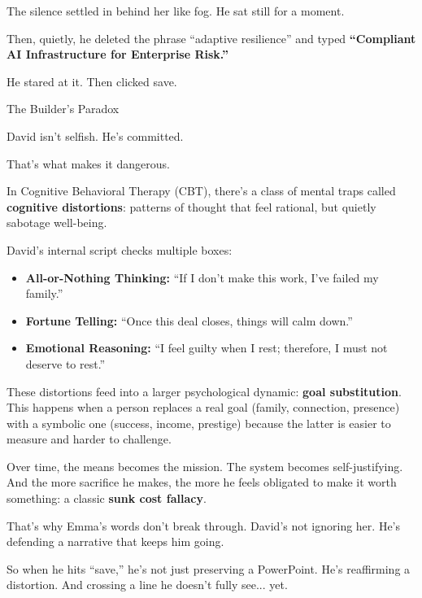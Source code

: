 The silence settled in behind her like fog. He sat still for a moment.

Then, quietly, he deleted the phrase ``adaptive resilience'' and typed \textbf{``Compliant AI Infrastructure 
for Enterprise Risk.''}

He stared at it. Then clicked save.

\medskip

\begin{PsychologicalSidebar}{The Builder’s Paradox}

  David isn’t selfish. He’s committed.

  \medskip
  
  That’s what makes it dangerous.
  
  \medskip
  
  In Cognitive Behavioral Therapy (CBT), there’s a class of mental traps called \textbf{cognitive distortions}: 
  patterns of thought that feel rational, but quietly sabotage well-being.

  \medskip
  
  David’s internal script checks multiple boxes:

  \medskip
  
  \begin{itemize}
    \item \textbf{All-or-Nothing Thinking:} “If I don’t make this work, I’ve failed my family.”
    \item \textbf{Fortune Telling:} “Once this deal closes, things will calm down.”
    \item \textbf{Emotional Reasoning:} “I feel guilty when I rest; therefore, I must not deserve to rest.”
  \end{itemize}
  
  \medskip
  
  These distortions feed into a larger psychological dynamic:  
  \textbf{goal substitution}. This happens when a person replaces a real goal (family, connection, presence) 
  with a symbolic one (success, income, prestige) because the latter is easier to measure and harder to challenge.

  \medskip
  
  Over time, the means becomes the mission.  
  The system becomes self-justifying.  
  And the more sacrifice he makes, the more he feels obligated to make it worth something: a classic \textbf{sunk cost fallacy}.
  
  \medskip
  
  That’s why Emma’s words don’t break through.  
  David’s not ignoring her. He’s defending a narrative that keeps him going.
  
  \medskip
  
  So when he hits “save,” he’s not just preserving a PowerPoint.
  He’s reaffirming a distortion.  
  And crossing a line he doesn’t fully see... yet.
  
\end{PsychologicalSidebar}

